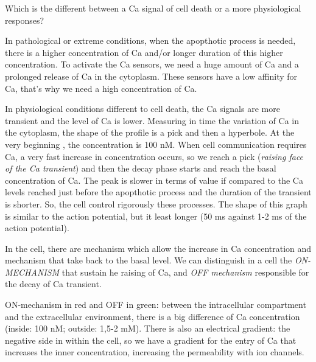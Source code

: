 \documentclass[a4paper, 12pt]{book}
\begin{document}
Which is the different between a Ca signal of cell death or a more physiological responses? 

In pathological or extreme conditions, when the apopthotic process is needed, there is a higher concentration of Ca and/or longer duration of this higher concentration. To activate the Ca sensors, we need a huge amount of Ca and a prolonged release of Ca in the cytoplasm. These sensors have a low affinity for Ca, that's why we need a high concentration of Ca.

In physiological conditions different to cell death, the Ca signals are more transient and the level of Ca is lower. Measuring in time the variation of Ca in the cytoplasm, the shape of the profile is a pick and then a hyperbole. At the very beginning , the concentration is 100 nM. When cell communication requires Ca, a very fast increase in concentration occurs, so we reach a pick (\emph{raising face of the Ca transient}) and then the decay phase starts and reach the basal concentration of Ca. The peak is slower in terms of value if compared to the Ca levels reached just before the apopthotic process and the duration of the transient is shorter. So, the cell control rigorously these processes. The shape of this graph is similar to the action potential, but it least longer (50 ms against 1-2 ms of the action potential). 

In the cell, there are mechanism which allow the increase in Ca concentration and mechanism that take back to the basal level. We can distinguish in a cell the \emph{ON-MECHANISM} that sustain he raising of Ca, and \emph{OFF mechanism} responsible for the decay of Ca transient.

ON-mechanism in red and OFF in green:  between the intracellular compartment and the extracellular environment, there is a big difference of Ca concentration (inside: 100 nM; outside: 1,5-2 mM). There is also an electrical gradient: the negative side in within the cell, so we have a gradient for the entry of Ca that increases the inner concentration, increasing the permeability with ion channels.
\end{document}
